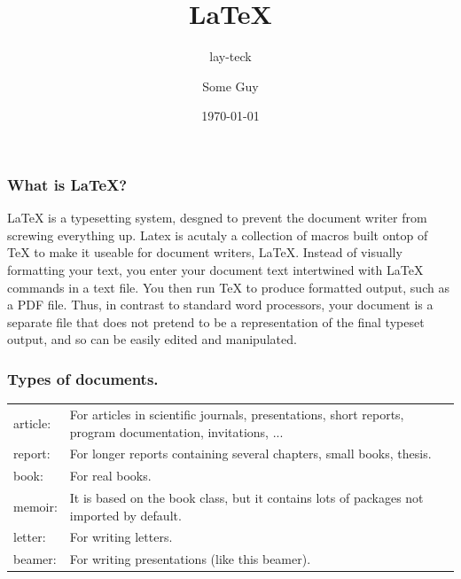 \documentclass{beamer}
\title{\LaTeX}
\subtitle{lay-teck}
\author{Some Guy}
\institute{Linux@APP}
\date{\today}
\begin{document}
\frame{\titlepage}
\begin{frame}
\frametitle{What is \LaTeX?}
LaTeX is a typesetting system, desgned to prevent the document writer from screwing everything up.
Latex is acutaly a collection of macros built ontop of TeX to make it useable for document writers, LaTeX. Instead of visually formatting your text, you enter your document text intertwined with LaTeX commands in a text file. You then run TeX to produce formatted output, such as a PDF file. Thus, in contrast to standard word processors, your document is a separate file that does not pretend to be a representation of the final typeset output, and so can be easily edited and manipulated. 

\end{frame}
\begin{frame}[fragile]
\frametitle{Types of documents.}
\renewcommand*{\arraystretch}{1.4}
\begin{longtable}{l p{3 in}}
article: &     For articles in scientific journals, presentations, short reports, program documentation, invitations, ... \\
report: &      For longer reports containing several chapters, small books, thesis. \\
book: &        For real books. \\
memoir: &      It is based on the book class, but it contains lots of packages not imported by default. \\
letter: &      For writing letters. \\
beamer: &      For writing presentations (like this beamer). \\
\end{longtable}
\end{frame}
\end{document}
